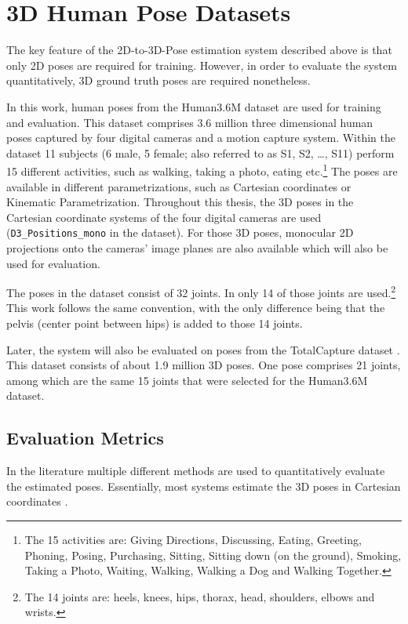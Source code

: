\section{3D Human Pose Datasets}
\label{sec:data}

The key feature of the 2D-to-3D-Pose estimation system described above is that only 2D poses are required for training.
However, in order to evaluate the system quantitatively, 3D ground truth poses are required nonetheless.

In this work, human poses from the Human3.6M dataset \cite{ionescu14} are used for training and evaluation.
This dataset comprises 3.6 million three dimensional human poses captured by four digital cameras and a motion capture system.
Within the dataset 11 subjects (6 male, 5 female; also referred to as S1, S2, \dots, S11) perform 15 different activities, such as walking, taking a photo, eating etc.\footnote{
	The 15 activities are: Giving Directions, Discussing, Eating, Greeting, Phoning, Posing, Purchasing, Sitting, Sitting down (on the ground), Smoking, Taking a Photo, Waiting, Walking, Walking a Dog and Walking Together.
}
The poses are available in different parametrizations, such as Cartesian coordinates or Kinematic Parametrization.
Throughout this thesis, the 3D poses in the Cartesian coordinate systems of the four digital cameras are used (\texttt{D3\_Positions\_mono} in the dataset).
For those 3D poses, monocular 2D projections onto the cameras' image planes are also available which will also be used for evaluation.

The poses in the dataset consist of 32 joints.
In \cite{drover18} only 14 of those joints are used.\footnote{
The 14 joints are: heels, knees, hips, thorax, head, shoulders, elbows and wrists.
}
This work follows the same convention, with the only difference being that the pelvis (center point between hips) is added to those 14 joints.

Later, the system will also be evaluated on poses from the TotalCapture dataset \cite{trumble17}.
This dataset consists of about 1.9 million 3D poses.
One pose comprises 21 joints, among which are the same 15 joints that were selected for the Human3.6M dataset.

\subsection{Evaluation Metrics}
In the literature multiple different methods are used to quantitatively evaluate the estimated poses. 
Essentially, most systems estimate the 3D poses in Cartesian coordinates \cite{drover18, chen17, bogo16, grinciunaite16, yasin16, wandt19, tome17, tekin16, tekin17, pavlakos17}.

